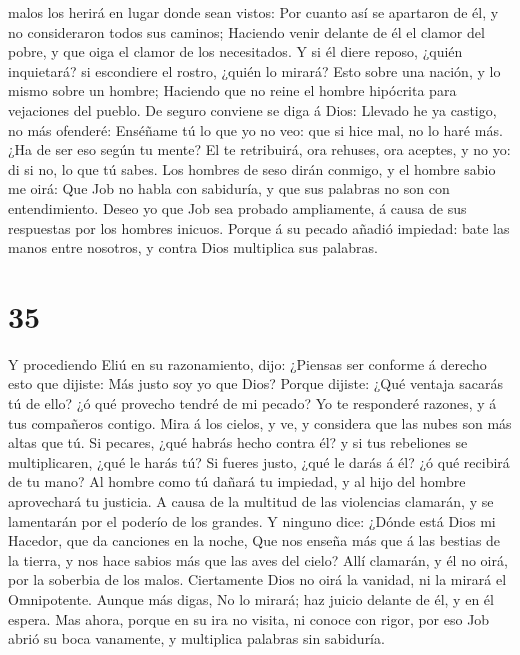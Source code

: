 malos los herirá en lugar donde sean vistos:  Por cuanto
así se apartaron de él, y no consideraron todos sus caminos;
 Haciendo venir delante de él el clamor del pobre, y que
oiga el clamor de los necesitados.  Y si él diere reposo,
¿quién inquietará? si escondiere el rostro, ¿quién lo mirará? Esto sobre
una nación, y lo mismo sobre un hombre;  Haciendo que no
reine el hombre hipócrita para vejaciones del pueblo.  De
seguro conviene se diga á Dios: Llevado he ya castigo, no más ofenderé:
 Enséñame tú lo que yo no veo: que si hice mal, no lo haré
más.  ¿Ha de ser eso según tu mente? El te retribuirá, ora
rehuses, ora aceptes, y no yo: di si no, lo que tú sabes. 
Los hombres de seso dirán conmigo, y el hombre sabio me oirá:
 Que Job no habla con sabiduría, y que sus palabras no son
con entendimiento.  Deseo yo que Job sea probado
ampliamente, á causa de sus respuestas por los hombres inicuos.
 Porque á su pecado añadió impiedad: bate las manos entre
nosotros, y contra Dios multiplica sus palabras.

\hypertarget{section-34}{%
\section{35}\label{section-34}}

 Y procediendo Eliú en su razonamiento, dijo: 
¿Piensas ser conforme á derecho esto que dijiste: Más justo soy yo que
Dios?  Porque dijiste: ¿Qué ventaja sacarás tú de ello? ¿ó
qué provecho tendré de mi pecado?  Yo te responderé razones,
y á tus compañeros contigo.  Mira á los cielos, y ve, y
considera que las nubes son más altas que tú.  Si pecares,
¿qué habrás hecho contra él? y si tus rebeliones se multiplicaren, ¿qué
le harás tú?  Si fueres justo, ¿qué le darás á él? ¿ó qué
recibirá de tu mano?  Al hombre como tú dañará tu impiedad,
y al hijo del hombre aprovechará tu justicia.  A causa de la
multitud de las violencias clamarán, y se lamentarán por el poderío de
los grandes.  Y ninguno dice: ¿Dónde está Dios mi Hacedor,
que da canciones en la noche,  Que nos enseña más que á las
bestias de la tierra, y nos hace sabios más que las aves del cielo?
 Allí clamarán, y él no oirá, por la soberbia de los malos.
 Ciertamente Dios no oirá la vanidad, ni la mirará el
Omnipotente.  Aunque más digas, No lo mirará; haz juicio
delante de él, y en él espera.  Mas ahora, porque en su ira
no visita, ni conoce con rigor, por eso Job abrió su boca vanamente, y
multiplica palabras sin sabiduría. 


